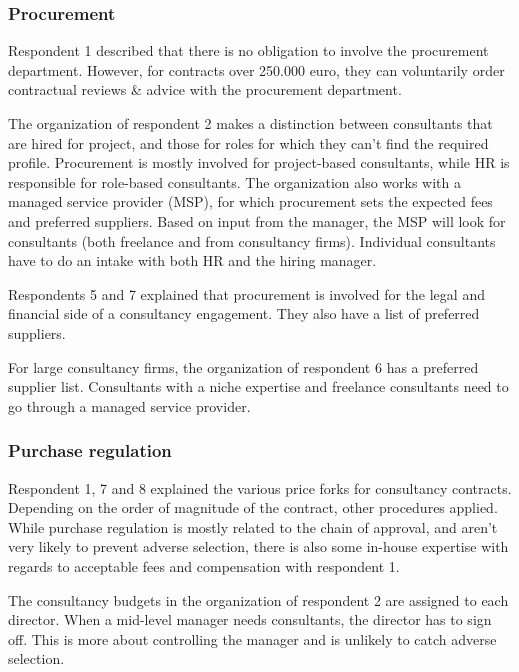 \documentclass[12pt]{article}
\begin{document}
\subsubsection{Procurement}\label{procurement-1}

Respondent 1 described that there is no obligation to involve the
procurement department. However, for contracts over 250.000 euro, they
can voluntarily order contractual reviews \& advice with the procurement
department.

The organization of respondent 2 makes a distinction between consultants
that are hired for project, and those for roles for which they can't
find the required profile. Procurement is mostly involved for
project-based consultants, while HR is responsible for role-based
consultants. The organization also works with a managed service provider
(MSP), for which procurement sets the expected fees and preferred
suppliers. Based on input from the manager, the MSP will look for
consultants (both freelance and from consultancy firms). Individual
consultants have to do an intake with both HR and the hiring manager.

Respondents 5 and 7 explained that procurement is involved for the legal
and financial side of a consultancy engagement. They also have a list of
preferred suppliers.

For large consultancy firms, the organization of respondent 6 has a
preferred supplier list. Consultants with a niche expertise and
freelance consultants need to go through a managed service provider.

\subsubsection{Purchase regulation}\label{purchase-regulation}

Respondent 1, 7 and 8 explained the various price forks for consultancy
contracts. Depending on the order of magnitude of the contract, other
procedures applied. While purchase regulation is mostly related to the
chain of approval, and aren't very likely to prevent adverse selection,
there is also some in-house expertise with regards to acceptable fees
and compensation with respondent 1.

The consultancy budgets in the organization of respondent 2 are assigned
to each director. When a mid-level manager needs consultants, the
director has to sign off. This is more about controlling the manager and
is unlikely to catch adverse selection.
\end{document}
